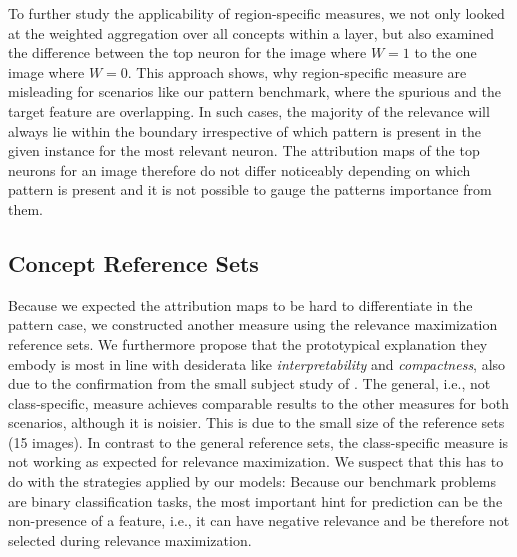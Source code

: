 To further study the applicability of region-specific measures, we not only looked at the weighted aggregation over all concepts within a layer, but also examined the difference between the top neuron for the image where $W=1$ to the one image where $W=0$. This approach shows, why region-specific measure are misleading for scenarios like our pattern benchmark, where the spurious and the target feature are overlapping. In such cases, the majority of the relevance will always lie within the boundary irrespective of which pattern is present in the given instance for the most relevant neuron. The attribution maps of the top neurons for an image therefore do not differ noticeably depending on which pattern is present and it is not possible to gauge the patterns importance from them. 

\subsection{Concept Reference Sets}
Because we expected the attribution maps to be hard to differentiate in the pattern case, we constructed another measure using the relevance maximization reference sets. We furthermore propose that the prototypical explanation they embody is most in line with desiderata like \textit{interpretability} and \textit{compactness}, also due to the confirmation from the small subject study of \cite{Achtibat2023}.
The general, i.e., not class-specific, measure achieves comparable results to the other measures for both scenarios, although it is noisier. This is due to the small size of the reference sets (15 images). 
In contrast to the general reference sets, the class-specific measure is not working as expected for relevance maximization. We suspect that this has to do with the strategies applied by our models: Because our benchmark problems are binary classification tasks, the most important hint for prediction can be the non-presence of a feature, i.e., it can have negative relevance and be therefore not selected during relevance maximization. 

